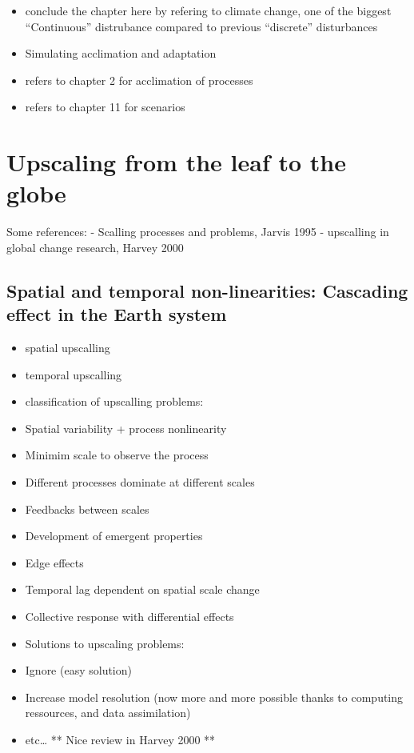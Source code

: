 \documentclass[oneside]{book}
\providecommand{\tightlist}{%
  \setlength{\itemsep}{0pt}\setlength{\parskip}{0pt}}
\begin{document}
\begin{itemize}
\tightlist
\item
  conclude the chapter here by refering to climate change, one of the
  biggest ``Continuous'' distrubance compared to previous ``discrete''
  disturbances
\item
  Simulating acclimation and adaptation
\item
  refers to chapter 2 for acclimation of processes
\item
  refers to chapter 11 for scenarios
\end{itemize}

\chapter{Upscaling from the leaf to the
globe}\label{upscaling-from-the-leaf-to-the-globe}

 Some references: - Scalling processes and problems,
Jarvis 1995 - upscalling in global change research, Harvey 2000

\section{Spatial and temporal non-linearities: Cascading effect in the
Earth
system}\label{spatial-and-temporal-non-linearities-cascading-effect-in-the-earth-system}

\begin{itemize}
\tightlist
\item
  spatial upscalling
\item
  temporal upscalling
\item
  classification of upscalling problems:
\item
  Spatial variability + process nonlinearity
\item
  Minimim scale to observe the process
\item
  Different processes dominate at different scales
\item
  Feedbacks between scales
\item
  Development of emergent properties
\item
  Edge effects
\item
  Temporal lag dependent on spatial scale change
\item
  Collective response with differential effects
\item
  Solutions to upscaling problems:
\item
  Ignore (easy solution)
\item
  Increase model resolution (now more and more possible thanks to
  computing ressources, and data assimilation)
\item
  etc\ldots{} ** Nice review in Harvey 2000 **
\end{itemize}
\end{document}
